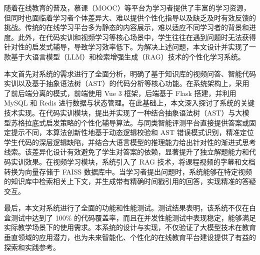 
随着在线教育的普及，慕课（MOOC）等平台为学习者提供了丰富的学习资源，但同时也面临着学习者个体差异大、难以提供个性化指导以及缺乏及时有效反馈的挑战。传统的在线学习平台多为静态的内容展示，难以适应不同学习者的背景和进度。此外，在代码实训和视频学习等核心场景中，学生往往在遇到问题时无法获得针对性的启发式辅导，导致学习效率低下。为解决上述问题，本文设计并实现了一款基于大语言模型（LLM）和检索增强生成（RAG）技术的个性化学习系统。

本文首先对系统的需求进行了全面分析，明确了基于知识库的视频问答、智能代码实训以及基于抽象语法树（AST）的代码分析等核心功能。在系统架构上，采用了前后端分离的模式，前端使用 Vue 3 框架，后端基于 Flask 搭建，并利用 MySQL 和 Redis 进行数据与状态管理。在此基础上，本文深入探讨了系统的关键技术实现。在代码实训模块，提出并实现了一种结合抽象语法树（AST）与大模型苏格拉底式启发策略的个性化辅导算法。与同类智能评测平台直接提供答案或固定提示不同，本算法创新性地基于动态逻辑校验和 AST 错误模式识别，精准定位学生代码的深层逻辑缺陷，并结合大语言模型的推理能力给出针对性的渐进式思考线索。该差异化设计有效避免了学生对答案的依赖，显著提升了独立解题能力和代码实训效果。在视频学习模块，系统引入了 RAG 技术，将课程视频的字幕和文档转换为向量存储于 FAISS 数据库中。当学习者提出问题时，系统能够在特定视频的知识库中检索相关上下文，并生成带有精确时间戳引用的回答，实现精准的答疑交互。

最后，本文对系统进行了全面的功能和性能测试。测试结果表明，该系统不仅在白盒测试中达到了 100\% 的代码覆盖率，而且在并发性能测试中表现稳定，能够满足实际教学场景下的使用需求。本系统的设计与实现，不仅验证了大模型技术在教育垂直领域的应用潜力，也为未来智能化、个性化的在线教育平台建设提供了有益的探索和实践参考。